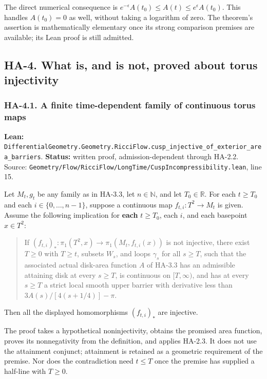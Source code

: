 \documentclass[
  letterpaper,
  11pt]{article}
\begin{document}
The direct numerical consequence is
\(e^{-\epsilon}A(t_0)\le A(t)\le e^\epsilon A(t_0)\). This handles
\(A(t_0)=0\) as well, without taking a logarithm of zero. The theorem's
assertion is mathematically elementary once its strong comparison
premises are available; its Lean proof is still admitted.

\subsection{HA-4. What is, and is not, proved about torus
injectivity}\label{ha-4}

\subsubsection{HA-4.1. A finite time-dependent family of continuous
torus maps}\label{ha-4-1}

\textbf{Lean:}
{\small\texttt{Differential\allowbreak{}Geometry.\allowbreak{}Geometry.\allowbreak{}Ricci\allowbreak{}Flow.\allowbreak{}cusp\_\allowbreak{}injective\_\allowbreak{}of\_\allowbreak{}exterior\_\allowbreak{}area\_\allowbreak{}barriers}}.
\textbf{Status:} written proof, admission-dependent through HA-2.2.
Source:
{\small\texttt{Geometry/\allowbreak{}Flow/\allowbreak{}Ricci\allowbreak{}Flow/\allowbreak{}Long\allowbreak{}Time/\allowbreak{}Cusp\allowbreak{}Incompressibility.\allowbreak{}lean}},
line 15.

Let \(M_t,g_t\) be any family as in HA-3.3, let \(n\in\mathbb N\), and
let \(T_0\in\mathbb R\). For each \(t\ge T_0\) and each
\(i\in\{0,\ldots,n-1\}\), suppose a continuous map
\(f_{t,i}:T^2\to M_t\) is given. Assume the following implication for
\textbf{each} \(t\ge T_0\), each \(i\), and each basepoint \(x\in T^2\):

\begin{quote}
If \((f_{t,i})_*:\pi_1(T^2,x)\to\pi_1(M_t,f_{t,i}(x))\) is not
injective, there exist \(T\ge0\) with \(T\ge t\), subsets \(W_s\), and
loops \(\gamma_s\) for all \(s\ge T\), such that the associated actual
disk-area function \(A\) of HA-3.3 has an admissible attaining disk at
every \(s\ge T\), is continuous on \([T,\infty)\), and has at every
\(s\ge T\) a strict local smooth upper barrier with derivative less than
\(3A(s)/[4(s+1/4)]-\pi\).
\end{quote}

Then all the displayed homomorphisms \((f_{t,i})_*\) are injective.

The proof takes a hypothetical noninjectivity, obtains the promised area
function, proves its nonnegativity from the definition, and applies
HA-2.3. It does not use the attainment conjunct; attainment is retained
as a geometric requirement of the premise. Nor does the contradiction
need \(t\le T\) once the premise has supplied a half-line with
\(T\ge0\).
\end{document}
